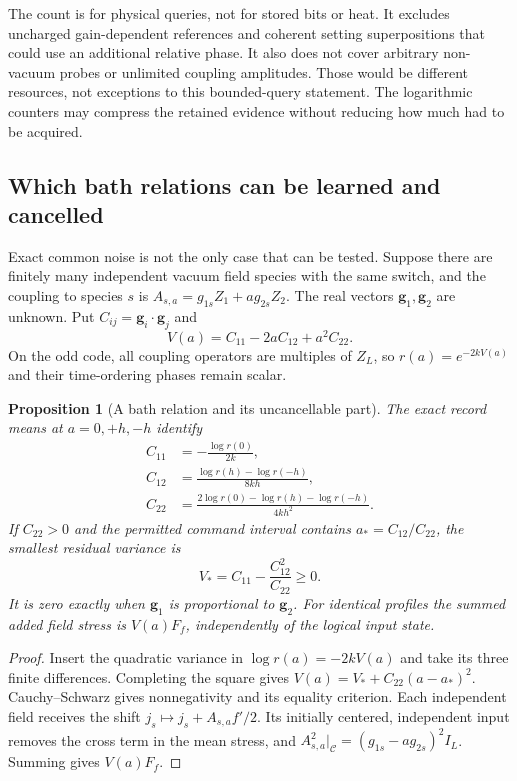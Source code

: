 \documentclass[11pt]{article}
\newtheorem{proposition}[theorem]{Proposition}
\theoremstyle{definition}
\theoremstyle{remark}
\begin{document}
The count is for physical queries, not for stored bits or heat. It
excludes uncharged gain-dependent references and coherent setting
superpositions that could use an additional relative phase. It also
does not cover arbitrary non-vacuum probes or unlimited coupling
amplitudes. Those would be different resources, not exceptions to
this bounded-query statement. The logarithmic counters may compress
the retained evidence without reducing how much had to be acquired.

\subsection{Which bath relations can be learned and cancelled}

Exact common noise is not the only case that can be tested. Suppose
there are finitely many independent vacuum field species with the same
switch, and the coupling to species $s$ is
$A_{s,a}=g_{1s}Z_1+a g_{2s}Z_2$. The real vectors
$\boldsymbol g_1,\boldsymbol g_2$ are unknown. Put
$C_{ij}=\boldsymbol g_i\cdot\boldsymbol g_j$ and
\begin{equation}
 V(a)=C_{11}-2aC_{12}+a^2C_{22}.
 \label{eq:bath_gram_variance}
\end{equation}
On the odd code, all coupling operators are multiples of $Z_L$,
so $r(a)=e^{-2kV(a)}$ and their time-ordering phases remain scalar.

\begin{proposition}[A bath relation and its uncancellable part]
\label{prop:bath_gram}
The exact record means at $a=0,+h,-h$ identify
\begin{align}
 C_{11}&=-\frac{\log r(0)}{2k},\nonumber\\
 C_{12}&=\frac{\log r(h)-\log r(-h)}{8kh},\nonumber\\
 C_{22}&=\frac{2\log r(0)-\log r(h)-\log r(-h)}{4kh^2}.
 \label{eq:gram_reconstruction}
\end{align}
If $C_{22}>0$ and the permitted command interval contains
$a_*=C_{12}/C_{22}$, the smallest residual variance is
\begin{equation}
 V_*=C_{11}-\frac{C_{12}^2}{C_{22}}\ge0.
 \label{eq:uncancellable_variance}
\end{equation}
It is zero exactly when $\boldsymbol g_1$ is proportional to
$\boldsymbol g_2$. For identical profiles the summed added field stress
is $V(a)F_f$, independently of the logical input state.
\end{proposition}
\begin{proof}
Insert the quadratic variance in $\log r(a)=-2kV(a)$ and take its
three finite differences. Completing the square gives
$V(a)=V_*+C_{22}(a-a_*)^2$. Cauchy--Schwarz gives nonnegativity and
its equality criterion. Each independent field receives the shift
$j_s\mapsto j_s+A_{s,a}f'/2$. Its initially centered, independent
input removes the cross term in the mean stress, and
$A_{s,a}^2|_{\mathcal C}=(g_{1s}-ag_{2s})^2I_L$. Summing gives $V(a)F_f$.
\end{proof}
\end{document}
